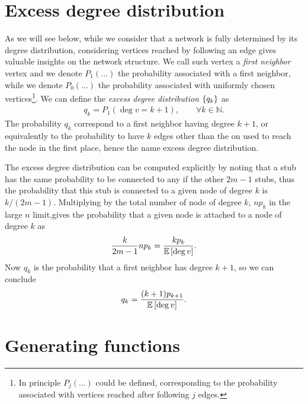 \documentclass[
11pt, %
english, %
singlespacing, %
nolistspacing, %
liststotoc, %
headsepline, %
]{MastersDoctoralThesis} %
\begin{document}
\section{Excess degree distribution}

As we will see below, while we consider that a network is fully determined by its degree distribution, considering vertices reached by following an edge gives valuable insights on the network structure. We call such vertex a \emph{first neighbor} vertex and we denote $P_1(\dots)$ the probability associated with a first neighbor, while we denote $P_0(\dots)$ the probability associated with uniformly chosen vertices\footnote{In principle $P_j(\dots)$ could be defined, corresponding to the probability associated with vertices reached after following $j$ edges.}. We can define the \emph{excess degree distribution} $\{q_k\}$ as
\begin{align}
	q_k = P_1(\deg{v} = k + 1), \qquad \forall k \in \mathbb{N}.
\end{align}
The probability $q_k$ correspond to a first neighbor having degree $k + 1$, or equivalently to the probability to have $k$ edges other than the on used to reach the node in the first place, hence the name excess degree distribution.

The excess degree distribution can be computed explicitly by noting that a stub has the same probability to be connected to any if the other $2 m - 1$ stubs, thus the probability that this stub is connected to a given node of degree $k$ is $k/(2 m - 1)$. Multiplying by the total number of node of degree $k$, $n p_k$ in the large $n$ limit,gives the probability that a given node is attached to a node of degree $k$ as
\begin{align}
	\frac{k}{2 m -1} n p_k = \frac{k p_k}{\mathbb{E}\left[ \deg{v} \right]}.
\end{align}
Now $q_k$ is the probability that a first neighbor has degree $k + 1$, so we can conclude
\begin{align}
	q_k = \frac{(k + 1) p_{k+1}}{\mathbb{E}\left[ \deg{v} \right]}. \label{qk as function of pk}
\end{align}

\section{Generating functions}
\label{Section: Generating functions}
\end{document}
